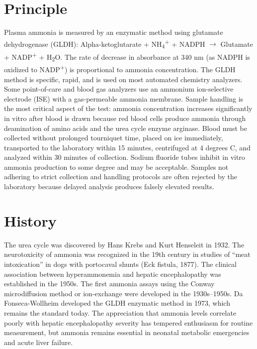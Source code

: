 \section*{Principle}
Plasma ammonia is measured by an enzymatic method using glutamate dehydrogenase (GLDH): Alpha-ketoglutarate + NH\textsubscript{4}\textsuperscript{+} + NADPH $\rightarrow$ Glutamate + NADP\textsuperscript{+} + H\textsubscript{2}O. The rate of decrease in absorbance at 340 nm (as NADPH is oxidized to NADP\textsuperscript{+}) is proportional to ammonia concentration. The GLDH method is specific, rapid, and is used on most automated chemistry analyzers. Some point-of-care and blood gas analyzers use an ammonium ion-selective electrode (ISE) with a gas-permeable ammonia membrane. Sample handling is the most critical aspect of the test: ammonia concentration increases significantly in vitro after blood is drawn because red blood cells produce ammonia through deamination of amino acids and the urea cycle enzyme arginase. Blood must be collected without prolonged tourniquet time, placed on ice immediately, transported to the laboratory within 15 minutes, centrifuged at 4 degrees C, and analyzed within 30 minutes of collection. Sodium fluoride tubes inhibit in vitro ammonia production to some degree and may be acceptable. Samples not adhering to strict collection and handling protocols are often rejected by the laboratory because delayed analysis produces falsely elevated results.

\section*{History}
The urea cycle was discovered by Hans Krebs and Kurt Henseleit in 1932. The neurotoxicity of ammonia was recognized in the 19th century in studies of ``meat intoxication'' in dogs with portocaval shunts (Eck fistula, 1877). The clinical association between hyperammonemia and hepatic encephalopathy was established in the 1950s. The first ammonia assays using the Conway microdiffusion method or ion-exchange were developed in the 1930s--1950s. Da Fonseca-Wollheim developed the GLDH enzymatic method in 1973, which remains the standard today. The appreciation that ammonia levels correlate poorly with hepatic encephalopathy severity has tempered enthusiasm for routine measurement, but ammonia remains essential in neonatal metabolic emergencies and acute liver failure.

